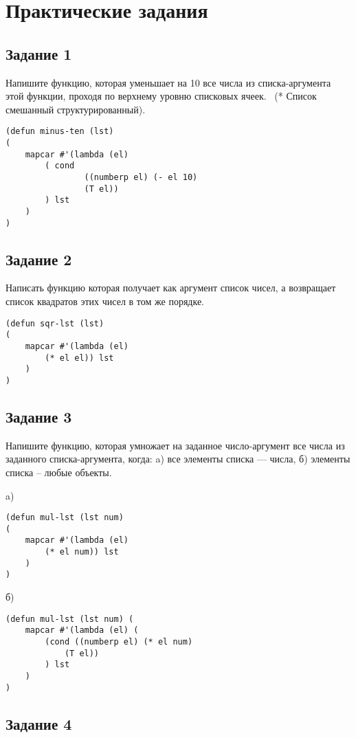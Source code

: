 
\section*{Практические задания}

\subsection*{Задание 1}

Напишите функцию, которая уменьшает на 10 все числа из списка-аргумента этой функции, проходя по верхнему уровню списковых ячеек. \ (* Список смешанный структурированный).

\begin{lstlisting}
(defun minus-ten (lst) 
(
    mapcar #'(lambda (el) 
        ( cond
                ((numberp el) (- el 10)
                (T el))
        ) lst
    )
)
\end{lstlisting}

\subsection*{Задание 2}

Написать функцию которая получает как аргумент список чисел, а возвращает список квадратов этих чисел в том же порядке.

\begin{lstlisting}
(defun sqr-lst (lst)
(
    mapcar #'(lambda (el)
        (* el el)) lst
    )
)
\end{lstlisting}

\subsection*{Задание 3}

Напишите функцию, которая умножает на заданное число-аргумент все числа из заданного списка-аргумента, когда:
a) все элементы списка --- числа,
б) элементы списка -- любые объекты.

a) 
\begin{lstlisting}
(defun mul-lst (lst num) 
(
    mapcar #'(lambda (el) 
        (* el num)) lst
    )
)
\end{lstlisting}
\newpage
б)
\begin{lstlisting}
(defun mul-lst (lst num) (
    mapcar #'(lambda (el) (
        (cond ((numberp el) (* el num)
            (T el))
        ) lst
    )
)
\end{lstlisting}

\subsection*{Задание 4}

